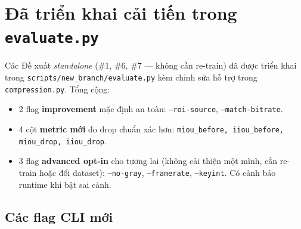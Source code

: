 \documentclass[12pt,a4paper]{article}
\begin{document}
\section{Đã triển khai cải tiến trong \texttt{evaluate.py}}

Các Đề xuất \emph{standalone} (\#1, \#6, \#7 — không cần re-train) đã được triển
khai trong \texttt{scripts/new\_branch/evaluate.py} kèm chỉnh sửa hỗ trợ trong
\texttt{compression.py}. Tổng cộng:
\begin{itemize}[leftmargin=2em]
  \item 2 flag \textbf{improvement} mặc định an toàn: \texttt{--roi-source},
        \texttt{--match-bitrate}.
  \item 4 cột \textbf{metric mới} đo drop chuẩn xác hơn:
        \texttt{miou\_before, iiou\_before, miou\_drop, iiou\_drop}.
  \item 3 flag \textbf{advanced opt-in} cho tương lai (không cải thiện một mình,
        cần re-train hoặc đổi dataset): \texttt{--no-gray}, \texttt{--framerate},
        \texttt{--keyint}. Có cảnh báo runtime khi bật sai cảnh.
\end{itemize}

\subsection{Các flag CLI mới}
\end{document}
